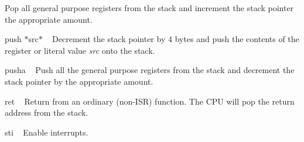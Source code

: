 \begin{DoxyItemize}
 Pop all general purpose registers from the stack and increment the stack pointer the appropriate amount.
\item {\ttfamily push $\ast$src$\ast$} ~\newline
 Decrement the stack pointer by 4 bytes and push the contents of the register or literal value {\itshape src} onto the stack.
\item {\ttfamily pusha} ~\newline
 Push all the general purpose registers from the stack and decrement the stack pointer by the appropriate amount.
\item {\ttfamily ret} ~\newline
 Return from an ordinary (non-\/\+ISR) function. The CPU will pop the return address from the stack.
\item {\ttfamily sti} ~\newline
 Enable interrupts. 
\end{DoxyItemize}
